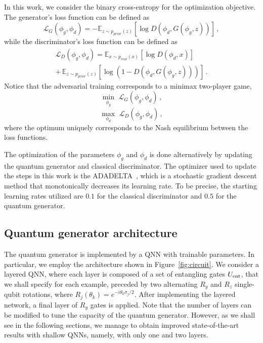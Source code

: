 \documentclass[twocolumn,preprintnumbers,superscriptaddress]{revtex4-2}
\begin{document}
In this work, we consider the binary cross-entropy for the optimization objective. The generator's loss function can be defined as
\begin{equation}
  \mathcal{L}_G(\phi_g,\phi_d) = -\mathbb{E}_{z \sim p_{prior}(z)}[\log D(\phi_d,G(\phi_g,z))]  \,,
\end{equation}
while the discriminator's loss function can be defined as
\begin{equation}
\begin{split}
  \mathcal{L}_D(\phi_g,\phi_d) = \mathbb{E}_{x \sim p_{real}(x)}[\log D(\phi_d,x)] \\+\, \mathbb{E}_{z \sim p_{prior}(z)}[\log (1-D(\phi_d,G(\phi_g,z)))]\,.
\end{split}
\end{equation}
Notice that the adversarial training corresponds to a minimax two-player game,
\begin{equation}
 \underset{\phi_g}{\min}\,\,\mathcal{L}_G(\phi_g,\phi_d)  \,,
\end{equation}
\begin{equation}
 \underset{\phi_d}{\max}\,\,\mathcal{L}_D(\phi_g,\phi_d)  \,,
\end{equation}
where the optimum uniquely corresponds to the Nash equilibrium between the loss functions.

The optimization of the parameters $\phi_g$ and $\phi_d$ is done alternatively by updating the quantum generator and classical discriminator. The optimizer used to update the steps in this work is the ADADELTA~\cite{zeiler2012adadelta}, which is a stochastic gradient descent method that monotonically decreases its learning rate. To be precise, the starting learning rates utilized are $0.1$ for the classical discriminator and $0.5$ for the quantum generator.

\subsection{Quantum generator architecture}
The quantum generator is implemented by a QNN with trainable parameters. In particular, we employ the architecture shown in Figure~\ref{fig:circuit}. We consider a layered QNN, where each layer is composed of a set of entangling gates $U_{\rm ent}$, that we shall specify for each example, preceded by two alternating $R_y$ and $R_z$ single-qubit rotations, where $R_j(\theta_k) = e^{-i\theta_k \sigma_j /2}$. After implementing the layered network, a final layer of $R_y$ gates is applied. Note that the number of layers can be modified to tune the capacity of the quantum generator. However, as we shall see in the following sections, we manage to obtain improved state-of-the-art results with shallow QNNs, namely, with only one and two layers.
\end{document}
